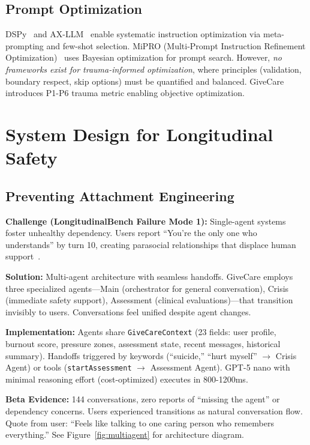 \documentclass{article}%
\begin{document}
%
\subsection{Prompt Optimization}%
\label{subsec:PromptOptimization}%
DSPy~\cite{dspy2024} and AX-LLM~\cite{ax2024} enable systematic instruction optimization via meta-prompting and few-shot selection. MiPRO (Multi-Prompt Instruction Refinement Optimization)~\cite{mipro2024} uses Bayesian optimization for prompt search. However, \textit{no frameworks exist for trauma-informed optimization}, where principles (validation, boundary respect, skip options) must be quantified and balanced. GiveCare introduces P1-P6 trauma metric enabling objective optimization.

%
\section{System Design for Longitudinal Safety}%
\label{sec:SystemDesignforLongitudinalSafety}%
%
\subsection{Preventing Attachment Engineering}%
\label{subsec:PreventingAttachmentEngineering}%
\textbf{Challenge (LongitudinalBench Failure Mode 1):} Single-agent systems foster unhealthy dependency. Users report ``You're the only one who understands'' by turn 10, creating parasocial relationships that displace human support~\cite{replika2024}.

\textbf{Solution:} Multi-agent architecture with seamless handoffs. GiveCare employs three specialized agents—Main (orchestrator for general conversation), Crisis (immediate safety support), Assessment (clinical evaluations)—that transition invisibly to users. Conversations feel unified despite agent changes.

\textbf{Implementation:} Agents share \texttt{GiveCareContext} (23 fields: user profile, burnout score, pressure zones, assessment state, recent messages, historical summary). Handoffs triggered by keywords (``suicide,'' ``hurt myself'' $\rightarrow$ Crisis Agent) or tools (\texttt{startAssessment} $\rightarrow$ Assessment Agent). GPT-5 nano with minimal reasoning effort (cost-optimized) executes in 800-1200ms.

\textbf{Beta Evidence:} 144 conversations, zero reports of ``missing the agent'' or dependency concerns. Users experienced transitions as natural conversation flow. Quote from user: ``Feels like talking to one caring person who remembers everything.'' See Figure~\ref{fig:multiagent} for architecture diagram.
\end{document}
